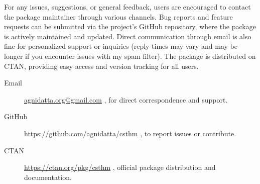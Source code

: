 \documentclass[10pt,letterpaper]{amsart}
\begin{document}
For any issues, suggestions, or general feedback, users are encouraged to
contact the package maintainer through various channels. Bug reports and
feature requests can be submitted via the project's GitHub repository, where
the package is actively maintained and updated. Direct communication through
email is also fine for personalized support or inquiries (reply times may vary
and may be longer if you encounter issues with my spam filter). The package is
distributed on CTAN, providing easy access and version tracking for all users.

\begin{description}
	\item[Email] \url{agnidatta.org@gmail.com} , for direct correspondence and support.
	\item[GitHub] \url{https://github.com/agnidatta/csthm} , to report issues or
	      contribute.
	\item[CTAN] \url{https://ctan.org/pkg/csthm} , official package distribution and
	      documentation.
\end{description}
\end{document}
